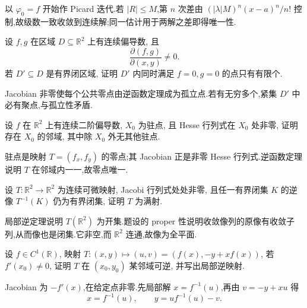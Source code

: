 \begin{solution}
    以 $\varphi_0=f$ 开始作 Picard 迭代.若 $|R|\leq M$,第 $n$ 次差由 $(|\lambda|M)^n(x-a)^n/n!$ 控制,故级数一致收敛到连续解;同一估计用于两解之差即得唯一性.
\end{solution}

\begin{example}
    设 $f,g$ 在区域 $D\subseteq\mathbb{R}^2$ 上有连续偏导数, 且
    \[
        \dfrac{\partial(f,g)}{\partial(x,y)}\ne0.
    \]
    若 $D'\subseteq D$ 是有界闭区域, 证明 $D'$ 内同时满足 $f=0,g=0$ 的点只有有限个.
\end{example}
\exampleblank

\begin{solution}
    Jacobian 非零使每个公共零点由逆函数定理成为孤立点.若有无穷多个,紧集 $D'$ 中必有聚点,与孤立性矛盾.
\end{solution}

\begin{example}
    设 $f$ 在 $\mathbb{R}^2$ 上有连续二阶偏导数, $X_0$ 为驻点, 且 Hesse 行列式在 $X_0$ 处非零, 证明存在 $X_0$ 的邻域, 其中除 $X_0$ 外无其他驻点.
\end{example}
\exampleblank

\begin{solution}
    驻点是映射 $T=(f_x,f_y)$ 的零点;其 Jacobian 正是非零 Hesse 行列式.逆函数定理说明 $T$ 在邻域内一一,故零点唯一.
\end{solution}

\begin{example}
    设 $T:\mathbb{R}^2\to\mathbb{R}^2$ 为连续可微映射, Jacobi 行列式处处非零, 且任一有界闭集 $K$ 的逆像 $T^{-1}(K)$ 仍为有界闭集, 证明 $T$ 为满射.
\end{example}
\exampleblank

\begin{solution}
    局部逆定理说明 $T(\mathbb{R}^2)$ 为开集.题设的 proper 性说明收敛像列的原像有收敛子列,从而像也是闭集.它非空,而 $\mathbb{R}^2$ 连通,故像为全平面.
\end{solution}

\begin{example}
    设 $f\in C^1(\mathbb{R})$, 映射 $T:(x,y)\mapsto(u,v)=(f(x),-y+xf(x))$, 若 $f'(x_0)\ne0$, 证明 $T$ 在 $(x_0,y_0)$ 某邻域可逆, 并写出局部逆映射.
\end{example}
\exampleblank

\begin{solution}
    Jacobian 为 $-f'(x)$,在给定点非零.先局部解 $x=f^{-1}(u)$,再由 $v=-y+xu$ 得
    \[
        x=f^{-1}(u),\qquad y=u f^{-1}(u)-v.
    \]
\end{solution}

